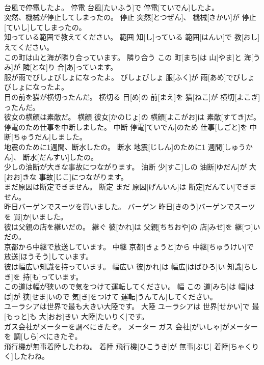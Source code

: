 \documentclass[8pt]{extreport}
\begin{document}
\begin{CJK}{UTF8}{min}
\\	台風で停電したよ。	停電	台風[たいふう]で 停電[ていでん]したよ。	
\\	突然、機械が停止してしまったの。	停止	突然[とつぜん]、 機械[きかい]が 停止[ていし]してしまったの。	
\\	知っている範囲で教えてください。	範囲	知[し]っている 範囲[はんい]で 教[おし]えてください。	
\\	この町は山と海が隣り合っています。	隣り合う	この 町[まち]は 山[やま]と 海[うみ]が 隣[とな]り 合[あ]っています。	
\\	服が雨でびしょびしょになったよ。	びしょびしょ	服[ふく]が 雨[あめ]でびしょびしょになったよ。	
\\	目の前を猫が横切ったんだ。	横切る	目[め]の 前[まえ]を 猫[ねこ]が 横切[よこぎ]ったんだ。	
\\	彼女の横顔は素敵だ。	横顔	彼女[かのじょ]の 横顔[よこがお]は 素敵[すてき]だ。	
\\	停電のため仕事を中断しました。	中断	停電[ていでん]のため 仕事[しごと]を 中断[ちゅうだん]しました。	
\\	地震のために1週間、断水したの。	断水	地震[じしん]のために1 週間[しゅうかん]、 断水[だんすい]したの。	
\\	少しの油断が大きな事故につながります。	油断	少[すこ]しの 油断[ゆだん]が 大[おお]きな 事故[じこ]につながります。	
\\	まだ原因は断定できません。	断定	まだ 原因[げんいん]は 断定[だんてい]できません。	
\\	昨日バーゲンでスーツを買いました。	バーゲン	昨日[きのう]バーゲンでスーツを 買[か]いました。	
\\	彼は父親の店を継いだの。	継ぐ	彼[かれ]は 父親[ちちおや]の 店[みせ]を 継[つ]いだの。	
\\	京都から中継で放送しています。	中継	京都[きょうと]から 中継[ちゅうけい]で 放送[ほうそう]しています。	
\\	彼は幅広い知識を持っています。	幅広い	彼[かれ]は 幅広[はばひろ]い 知識[ちしき]を 持[も]っています。	
\\	この道は幅が狭いので気をつけて運転してください。	幅	この 道[みち]は 幅[はば]が 狭[せま]いので 気[き]をつけて 運転[うんてん]してください。	
\\	ユーラシアは世界で最も大きい大陸です。	大陸	ユーラシアは 世界[せかい]で 最[もっと]も 大[おお]きい 大陸[たいりく]です。	
\\	ガス会社がメーターを調べにきたぞ。	メーター	ガス 会社[がいしゃ]がメーターを 調[しら]べにきたぞ。	
\\	飛行機が無事着陸したわね。	着陸	飛行機[ひこうき]が 無事[ぶじ] 着陸[ちゃくりく]したわね。	

\end{CJK}
\end{document}
